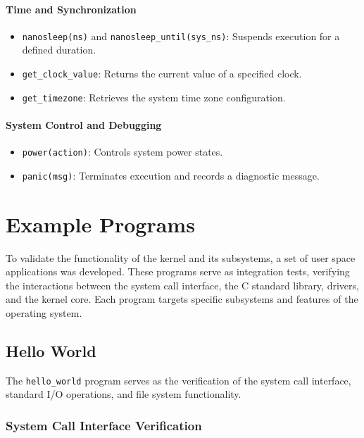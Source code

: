 \documentclass[a4paper,10pt,twoside]{report}
\theoremstyle{definition}
\begin{document}
\paragraph{Time and Synchronization}
\begin{itemize}
    \item \texttt{nanosleep(ns)} and \texttt{nanosleep\_until(sys\_ns)}: Suspends execution for a defined duration.
    \item \texttt{get\_clock\_value}: Returns the current value of a specified clock.
    \item \texttt{get\_timezone}: Retrieves the system time zone configuration.
\end{itemize}

\paragraph{System Control and Debugging}
\begin{itemize}
    \item \texttt{power(action)}: Controls system power states.
    \item \texttt{panic(msg)}: Terminates execution and records a diagnostic message.
\end{itemize}


\section{Example Programs}
\label{sec::example_programs}

To validate the functionality of the kernel and its subsystems, a set of user space applications was developed. These programs serve as integration tests, verifying the interactions between the system call interface, the C standard library, drivers, and the kernel core. Each program targets specific subsystems and features of the operating system.

\subsection{Hello World}

The \texttt{hello\_world} program serves as the verification of the system call interface, standard I/O operations, and file system functionality.

\subsubsection{System Call Interface Verification}
\end{document}
